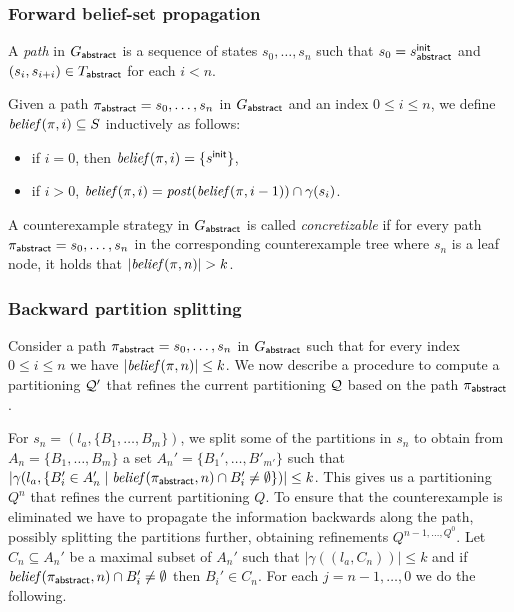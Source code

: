 \subsubsection{Forward belief-set propagation}

A \emph{path} in $G_{\mathsf{abstract}}$ is a sequence of states $s_0,\ldots,s_n$ such that $s_0 = s_{\mathsf{abstract}}^{\mathsf{init}}$ and $(s_i,s_{i+i}) \in T_{\mathsf{abstract}}$ for each $i < n$.

Given a path $\pi_{\mathsf{abstract}} = s_0,\ldots,s_n$ in $G_{\mathsf{abstract}}$ and an index $0 \leq i \leq n$, we define $\mathit{belief}(\pi,i)\subseteq S$ inductively as follows:
\begin{itemize}
\item if $i = 0$, then $\mathit{belief}(\pi,i) = \{s^{\mathsf{init}}\}$,
\item if $i > 0$, $\mathit{belief}(\pi,i) = \mathit{post}(\mathit{belief}(\pi,i-1)) \cap \gamma(s_i)$.
\end{itemize}

A counterexample strategy in $G_{\mathsf{abstract}}$ is called \emph{concretizable} if for every path $\pi_{\mathsf{abstract}} = s_0,\ldots,s_n$ in the corresponding counterexample tree where $s_n$ is a leaf node, it holds that $|\mathit{belief}(\pi,n)| > k$.

\subsubsection{Backward partition splitting}
Consider a path $\pi_{\mathsf{abstract}} = s_0,\ldots,s_n$ in $G_{\mathsf{abstract}}$ such that for every index $0 \leq i \leq n$ we have $|\mathit{belief}(\pi,n)| \leq k$. We now describe a procedure to compute a partitioning $\mathcal{Q}'$ that refines the current partitioning $\mathcal{Q}$ based on the path $\pi_{\mathsf{abstract}}$.


For $s_n  =(l_a,\{B_1,\ldots,B_m\})$, we split some of the partitions in $s_n$ to obtain from $A_n = \{B_1,\ldots,B_m\}$ a set $A_n' = \{B_1',\ldots, B'_{m'}\}$ such that $|\gamma(l_a,\{B_i' \in A_n' \mid \mathit{belief}(\pi_{\mathsf{abstract}}, n) \cap B_i' \neq \emptyset\})| \leq k$.
This gives us a partitioning $Q^n$ that refines the current partitioning $Q$. To ensure that the counterexample is eliminated we have to propagate the information backwards along the path, possibly splitting the partitions further, obtaining refinements $Q^{n-1,\ldots,Q^0}$.
Let $C_n \subseteq A_n'$ be a maximal subset of $A_n'$ such that $|\gamma((l_a,C_n))| \leq k$ and if $\mathit{belief}(\pi_{\mathsf{abstract}}, n) \cap B_i' \neq \emptyset$ then $B_i' \in C_n$.
For each $j = n-1,\ldots,0$ we do the following.

